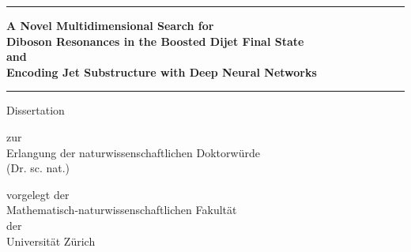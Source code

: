 \begin{center}

  \thispagestyle{empty}
  {\parindent0cm
   \rule{\linewidth}{.4ex}}
  \begin{center}

    \bfseries\large
    A Novel Multidimensional Search for\\ 
    Diboson Resonances in the Boosted Dijet Final State\\
    \vspace{0.2 in}
    and\\
    \vspace{0.2 in}
    Encoding Jet Substructure with Deep Neural Networks\\
  \end{center}
  \rule{\linewidth}{.4ex}

\par
\vspace{0.2 in}

{\large Dissertation}
\vspace{0.1in}

zur \\
Erlangung der 
naturwissenschaftlichen Doktorw\"urde \\
(Dr. sc. nat.) \\
\par
\vspace{0.2in}


vorgelegt der\\
Mathematisch-naturwissenschaftlichen Fakult\"at \\
der \\
\vspace{0.05in}
{\large Universit\"at Z\"urich}
\par


\end{center}

